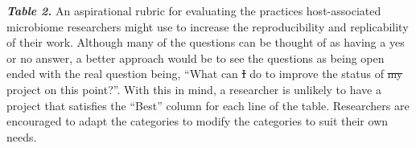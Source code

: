 \documentclass[]{article}
\providecommand{\DIFaddtex}[1]{{\protect\color{blue}\uwave{#1}}} %
\providecommand{\DIFdeltex}[1]{{\protect\color{red}\sout{#1}}}                      %
\providecommand{\DIFaddbegin}{} %
\providecommand{\DIFaddend}{} %
\providecommand{\DIFdelbegin}{} %
\providecommand{\DIFdelend}{} %
\providecommand{\DIFadd}[1]{\texorpdfstring{\DIFaddtex{#1}}{#1}} %
\providecommand{\DIFdel}[1]{\texorpdfstring{\DIFdeltex{#1}}{}} %
\begin{document}
\newpage

\textbf{\emph{Table 2.}} An aspirational rubric for evaluating the
practices host-associated microbiome researchers might use to increase
the reproducibility and replicability of their work. Although many of
the questions can be thought of as having a yes or no answer, a better
approach would be to see the questions as being open ended with the real
question being, ``What can \DIFdelbegin \DIFdel{I }\DIFdelend \DIFaddbegin \DIFadd{we }\DIFaddend do to improve the status of \DIFdelbegin \DIFdel{my }\DIFdelend \DIFaddbegin \DIFadd{our }\DIFaddend project on
this point?''. With this in mind, a researcher is unlikely to have a
project that satisfies the ``Best'' column for each line of the table.
Researchers are encouraged to adapt the categories to modify the
categories to suit their own needs.
\end{document}
